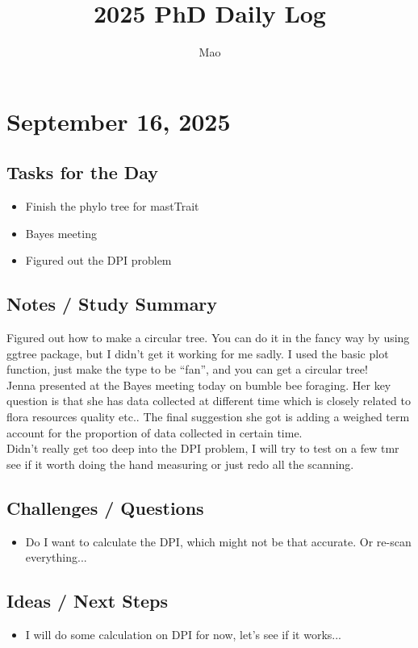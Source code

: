 \documentclass[12pt]{article}
\title{\textbf{2025 PhD Daily Log}}
\author{Mao}
\begin{document}
\maketitle
\tableofcontents
\newpage

\section*{September 16, 2025}

\subsection*{Tasks for the Day}
\begin{itemize}
    \item Finish the phylo tree for mastTrait
    \item Bayes meeting
    \item Figured out the DPI problem
\end{itemize}
\subsection*{Notes / Study Summary}
Figured out how to make a circular tree. You can do it in the fancy way by using ggtree package, but I didn't get it working for me sadly. I used the basic plot function, just make the type to be ``fan'', and you can get a circular tree!\\
Jenna presented at the Bayes meeting today on bumble bee foraging. Her key question is that she has data collected at different time which is closely related to flora resources quality etc.. The final suggestion she got is adding a weighed term account for the proportion of data collected in certain time.\\
Didn't really get too deep into the DPI problem, I will try to test on a few tmr see if it worth doing the hand measuring or just redo all the scanning.
\subsection*{Challenges / Questions}
\begin{itemize}
    \item Do I want to calculate the DPI, which might not be that accurate. Or re-scan everything...
\end{itemize}

\subsection*{Ideas / Next Steps}
\begin{itemize}
    \item I will do some calculation on DPI for now, let's see if it works...
\end{itemize}
\end{document}
